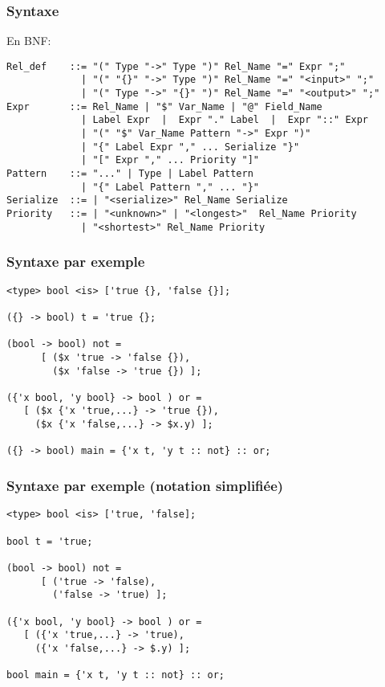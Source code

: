\documentclass{beamer}
\newcommand{\mypause}{\pause}
\begin{document}
\begin{frame}[fragile]
\frametitle{Syntaxe}

En BNF: {\scriptsize\color{red}
\begin{verbatim}
Rel_def    ::= "(" Type "->" Type ")" Rel_Name "=" Expr ";"
             | "(" "{}" "->" Type ")" Rel_Name "=" "<input>" ";"
             | "(" Type "->" "{}" ")" Rel_Name "=" "<output>" ";"
Expr       ::= Rel_Name | "$" Var_Name | "@" Field_Name   
             | Label Expr  |  Expr "." Label  |  Expr "::" Expr 
             | "(" "$" Var_Name Pattern "->" Expr ")" 
             | "{" Label Expr "," ... Serialize "}" 
             | "[" Expr "," ... Priority "]"
Pattern    ::= "..." | Type | Label Pattern 
             | "{" Label Pattern "," ... "}"
Serialize  ::= | "<serialize>" Rel_Name Serialize
Priority   ::= | "<unknown>" | "<longest>"  Rel_Name Priority
             | "<shortest>" Rel_Name Priority
\end{verbatim}}


\end{frame}


\begin{frame}[fragile]
\frametitle{Syntaxe par exemple}\color{blue}
\footnotesize \mypause
\begin{verbatim}
<type> bool <is> ['true {}, 'false {}];

({} -> bool) t = 'true {}; 

(bool -> bool) not =
      [ ($x 'true -> 'false {}),    
        ($x 'false -> 'true {}) ];

({'x bool, 'y bool} -> bool ) or = 
   [ ($x {'x 'true,...} -> 'true {}),
     ($x {'x 'false,...} -> $x.y) ];    	

({} -> bool) main = {'x t, 'y t :: not} :: or;
\end{verbatim}
\end{frame}

\begin{frame}[fragile]
\frametitle{Syntaxe par exemple (notation simplifiée)}\color{blue}
\footnotesize \mypause
\begin{verbatim}
<type> bool <is> ['true, 'false];  

bool t = 'true;                    

(bool -> bool) not =
      [ ('true -> 'false),         
        ('false -> 'true) ];       

({'x bool, 'y bool} -> bool ) or = 
   [ ({'x 'true,...} -> 'true),    
     ({'x 'false,...} -> $.y) ];   	

bool main = {'x t, 'y t :: not} :: or; 
\end{verbatim}
\end{frame}
\end{document}
